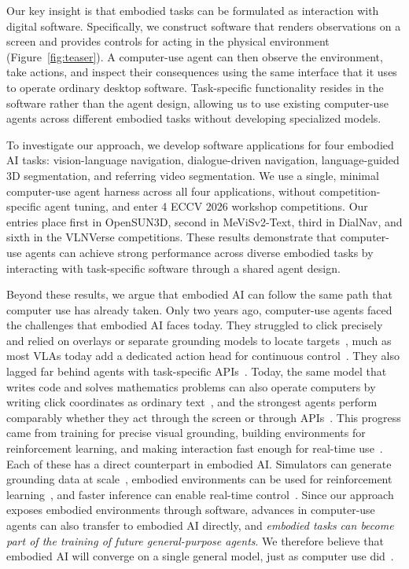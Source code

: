 \documentclass{article}
\begin{document}
Our key insight is that embodied tasks can be formulated as interaction with digital software. Specifically, we construct software that renders observations on a screen and provides controls for acting in the physical environment (Figure~\ref{fig:teaser}). A computer-use agent can then observe the environment, take actions, and inspect their consequences using the same interface that it uses to operate ordinary desktop software. Task-specific functionality resides in the software rather than the agent design, allowing us to use existing computer-use agents across different embodied tasks without developing specialized models.

To investigate our approach, we develop software applications for four embodied AI tasks: vision-language navigation, dialogue-driven navigation, language-guided 3D segmentation, and referring video segmentation. We use a single, minimal computer-use agent harness across all four applications, without competition-specific agent tuning, and enter 4 ECCV 2026 workshop competitions. Our entries place first in OpenSUN3D, second in MeViSv2-Text, third in DialNav, and sixth in the VLNVerse competitions. These results demonstrate that computer-use agents can achieve strong performance across diverse embodied tasks by interacting with task-specific software through a shared agent design.

Beyond these results, we argue that embodied AI can follow the same path that computer use has already taken. Only two years ago, computer-use agents faced the challenges that embodied AI faces today. They struggled to click precisely and relied on overlays or separate grounding models to locate targets~\citep{yang2023som,zheng2024seeact,gou2025uground}, much as most VLAs today add a dedicated action head for continuous control~\citep{black2025pi05,nvidia2025gr00t}. They also lagged far behind agents with task-specific APIs~\citep{xie2024osworld,aggarwal2026pwp,song2025beyondbrowsing}. Today, the same model that writes code and solves mathematics problems can also operate computers by writing click coordinates as ordinary text~\citep{anthropic2024computeruse,google2026gemini35cu}, and the strongest agents perform comparably whether they act through the screen or through APIs~\citep{neocognition2026apprenticebench}. This progress came from training for precise visual grounding, building environments for reinforcement learning, and making interaction fast enough for real-time use~\citep{gou2025uground,aggarwal2026gymanything,wang2026cuagym,aggarwal2026cuaspeedrun}. Each of these has a direct counterpart in embodied AI. Simulators can generate grounding data at scale~\citep{yuan2024robopoint}, embodied environments can be used for reinforcement learning~\citep{li2026simplevlarl}, and faster inference can enable real-time control~\citep{black2025rtc}. Since our approach exposes embodied environments through software, advances in computer-use agents can also transfer to embodied AI directly, and \textit{embodied tasks can become part of the training of future general-purpose agents}. We therefore believe that embodied AI will converge on a single general model, just as computer use did~\citep{openai2026astra,anthropic2026opus55}.
\end{document}
